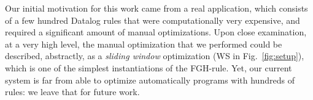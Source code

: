 

Our initial motivation for this work came from a real application,
which consists of a few hundred Datalog rules that were
computationally very expensive, and required a significant amount of
manual optimizations.  Upon close examination, at a very high level,
the manual optimization that we performed could be described,
abstractly, as a {\em sliding window} optimization (WS in
Fig.~\ref{fig:setup}), which is one of the simplest instantiations of
the FGH-rule.  Yet, our current system is far from able to optimize
automatically programs with hundreds of rules: we leave that for
future work.

